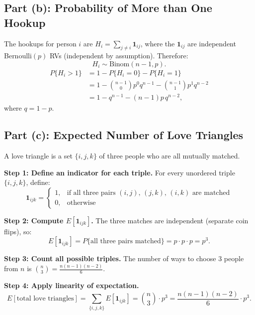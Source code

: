 \documentclass[12pt]{article}
\theoremstyle{definition_style}
\begin{document}
\subsection{Part (b): Probability of More than One Hookup}

The hookups for person $i$ are $H_i = \sum_{j \ne i} \mathbf{1}_{ij}$, where the $\mathbf{1}_{ij}$ are independent Bernoulli$(p)$ RVs (independent by assumption). Therefore:
\[
    H_i \sim \mathrm{Binom}(n-1, p).
\]
\begin{align*}
    P\{H_i > 1\} &= 1 - P\{H_i = 0\} - P\{H_i = 1\} \\
                 &= 1 - \binom{n-1}{0} p^0 q^{n-1} - \binom{n-1}{1} p^1 q^{n-2} \\
                 &= \boxed{1 - q^{n-1} - (n-1)p\,q^{n-2},}
\end{align*}
where $q = 1 - p$.

\subsection{Part (c): Expected Number of Love Triangles}

A love triangle is a set $\{i, j, k\}$ of three people who are all mutually matched.

\textbf{Step 1: Define an indicator for each triple.} For every unordered triple $\{i,j,k\}$, define:
\[
    \mathbf{1}_{ijk} = \begin{cases} 1, & \text{if all three pairs } (i,j),\, (j,k),\, (i,k) \text{ are matched} \\ 0, & \text{otherwise} \end{cases}
\]

\textbf{Step 2: Compute $E[\mathbf{1}_{ijk}]$.} The three matches are independent (separate coin flips), so:
\[
    E[\mathbf{1}_{ijk}] = P\{\text{all three pairs matched}\} = p \cdot p \cdot p = p^3.
\]

\textbf{Step 3: Count all possible triples.} The number of ways to choose 3 people from $n$ is $\binom{n}{3} = \frac{n(n-1)(n-2)}{6}$.

\textbf{Step 4: Apply linearity of expectation.}
\[
    E[\text{total love triangles}] = \sum_{\{i,j,k\}} E[\mathbf{1}_{ijk}] = \binom{n}{3} \cdot p^3 = \boxed{\frac{n(n-1)(n-2)}{6} \cdot p^3.}
\]
\end{document}
